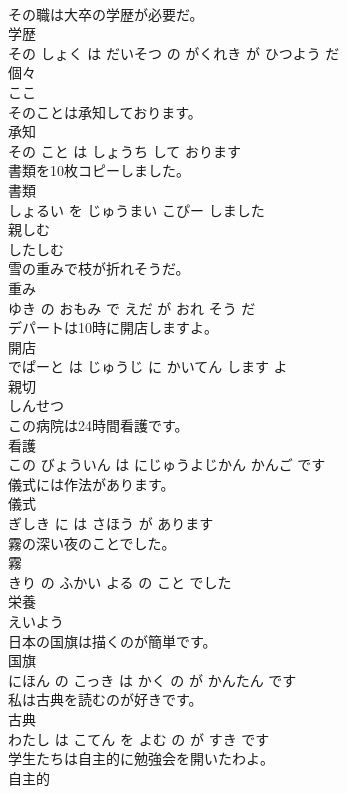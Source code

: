 \documentclass[8pt]{extreport}
\begin{document}
\begin{CJK}{UTF8}{min}
\\	その職は大卒の学歴が必要だ。	
\\	学歴 
\\	その しょく は だいそつ の がくれき が ひつよう だ			
\\	個々	
\\	ここ		
\\	そのことは承知しております。	
\\	承知 
\\	その こと は しょうち して おります			
\\	書類を10枚コピーしました。	
\\	書類 
\\	しょるい を じゅうまい こぴー しました			
\\	親しむ	
\\	したしむ		
\\	雪の重みで枝が折れそうだ。	
\\	重み 
\\	ゆき の おもみ で えだ が おれ そう だ			
\\	デパートは10時に開店しますよ。	
\\	開店 
\\	でぱーと は じゅうじ に かいてん します よ			
\\	親切	
\\	しんせつ		
\\	この病院は24時間看護です。	
\\	看護 
\\	この びょういん は にじゅうよじかん かんご です			
\\	儀式には作法があります。	
\\	儀式 
\\	ぎしき に は さほう が あります			
\\	霧の深い夜のことでした。	
\\	霧 
\\	きり の ふかい よる の こと でした			
\\	栄養	
\\	えいよう		
\\	日本の国旗は描くのが簡単です。	
\\	国旗 
\\	にほん の こっき は かく の が かんたん です			
\\	私は古典を読むのが好きです。	
\\	古典 
\\	わたし は こてん を よむ の が すき です			
\\	学生たちは自主的に勉強会を開いたわよ。	
\\	自主的 

\end{CJK}
\end{document}

